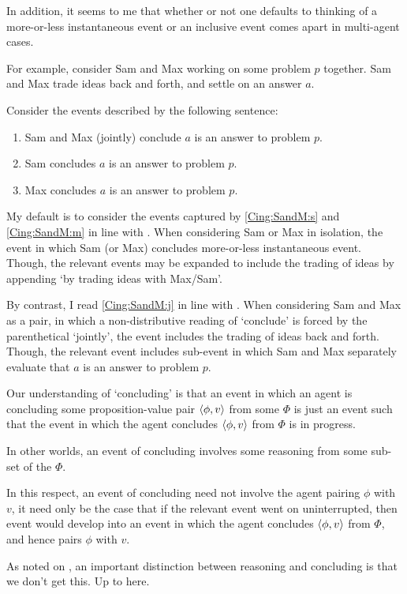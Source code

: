 \begin{note}
  In addition, it seems to me that whether or not one defaults to thinking of a more-or-less instantaneous event or an inclusive event comes apart in multi-agent cases.

  For example, consider Sam and Max working on some problem \(p\) together.
  Sam and Max trade ideas back and forth, and settle on an answer \(a\).

  Consider the events described by the following sentence:
  \begin{enumerate}[label=\arabic*., ref=(\arabic*)]
  \item
    \label{Cing:SandM:j}
    Sam and Max (jointly) conclude \(a\) is an answer to problem \(p\).
  \item
    \label{Cing:SandM:s}
    Sam concludes \(a\) is an answer to problem \(p\).
  \item
    \label{Cing:SandM:m}
    Max concludes \(a\) is an answer to problem \(p\).
  \end{enumerate}

  My default is to consider the events captured by \ref{Cing:SandM:s} and \ref{Cing:SandM:m} in line with \citeauthor{Gardner:1986wp}.
  When considering Sam or Max in isolation, the event in which Sam (or Max) concludes more-or-less instantaneous event.
  Though, the relevant events may be expanded to include the trading of ideas by appending `by trading ideas with Max/Sam'.

  By contrast, I read \ref{Cing:SandM:j} in line with \citeauthor{Bratman:1979aa}.
  When considering Sam and Max as a pair, in which a non-distributive reading of `conclude' is forced by the parenthetical `jointly', the event includes the trading of ideas back and forth.
  Though, the relevant event includes sub-event in which Sam and Max separately evaluate that \(a\) is an answer to problem \(p\).
\end{note}

\begin{note}
  Our understanding of `concluding' is that an event in which an agent is concluding some proposition-value pair \(\langle \phi, v \rangle\) from some \poP{} \(\Phi\) is just an event such that the event in which the agent concludes \(\langle \phi, v \rangle\) from \(\Phi\) is in progress.

  In other worlds, an event of concluding involves some reasoning from some sub-set of the \poP{} \(\Phi\).

  In this respect, an event of concluding need not involve the agent pairing \(\phi\) with \(v\), it need only be the case that if the relevant event went on uninterrupted, then event would develop into an event in which the agent concludes \(\langle \phi, v \rangle\) from \(\Phi\), and hence pairs \(\phi\) with \(v\).

  As noted on , an important distinction between reasoning and concluding is that we don't get this.
  {
    \color{red} Up to here.
  }
\end{note}

